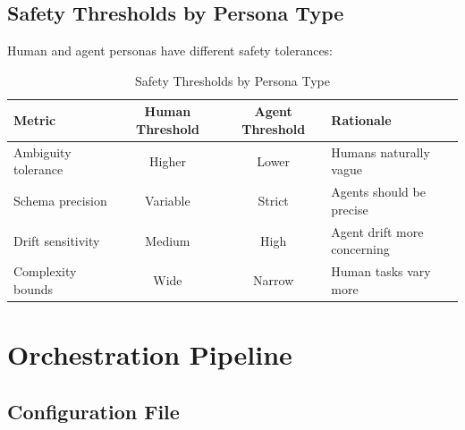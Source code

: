 \subsection{Safety Thresholds by Persona Type}

Human and agent personas have different safety tolerances:

\begin{table}[htbp]
\centering
\caption{Safety Thresholds by Persona Type}
\label{tab:safety-thresholds}
\begin{tabular}{l c c l}
\toprule
\textbf{Metric} & \textbf{Human Threshold} & \textbf{Agent Threshold} & \textbf{Rationale} \\
\midrule
Ambiguity tolerance & Higher & Lower & Humans naturally vague \\
Schema precision & Variable & Strict & Agents should be precise \\
Drift sensitivity & Medium & High & Agent drift more concerning \\
Complexity bounds & Wide & Narrow & Human tasks vary more \\
\bottomrule
\end{tabular}
\end{table}

\section{Orchestration Pipeline}
\label{sec:orchestration}

\subsection{Configuration File}

